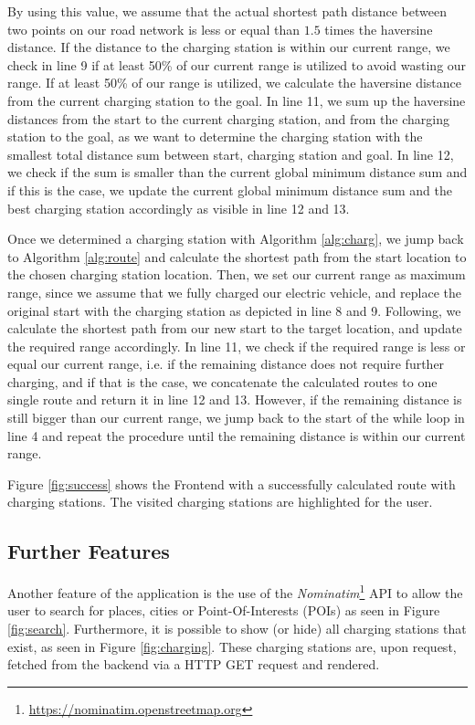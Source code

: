 \documentclass[a4paper]{article}
\begin{document}
By using this value, we assume that the actual shortest path distance between two points on our road network is less or equal than $1.5$ times the haversine distance.
If the distance to the charging station is within our current range, we check in line 9 if at least 50\% of our current range is utilized to avoid wasting our range.
If at least 50\% of our range is utilized, we calculate the haversine distance from the current charging station to the goal.
In line 11, we sum up the haversine distances from the start to the current charging station, and from the charging station to the goal, as we want to determine the charging station with the smallest total distance sum between start, charging station and goal.
In line 12, we check if the sum is smaller than the current global minimum distance sum and if this is the case, we update the current global minimum distance sum and the best charging station accordingly as visible in line 12 and 13.\par\medskip
Once we determined a charging station with Algorithm \ref{alg:charg}, we jump back to Algorithm \ref{alg:route} and calculate the shortest path from the start location to the chosen charging station location.
Then, we set our current range as maximum range, since we assume that we fully charged our electric vehicle, and replace the original start with the charging station as depicted in line 8 and 9.
Following, we calculate the shortest path from our new start to the target location, and update the required range accordingly.
In line 11, we check if the required range is less or equal our current range, i.e. if the remaining distance does not require further charging, and if that is the case, we concatenate the calculated routes to one single route and return it in line 12 and 13.
However, if the remaining distance is still bigger than our current range, we jump back to the start of the while loop in line 4 and repeat the procedure until the remaining distance is within our current range.\par\bigskip
Figure \ref{fig:success} shows the Frontend with a successfully calculated route with charging stations.
The visited charging stations are highlighted for the user. \\
\subsection{Further Features}
Another feature of the application is the use of the \textit{Nominatim}\footnote{\url{https://nominatim.openstreetmap.org}} API to allow the user to search for places, cities or Point-Of-Interests (POIs) as seen in Figure \ref{fig:search}.
Furthermore, it is possible to show (or hide) all charging stations that exist, as seen in Figure \ref{fig:charging}.
These charging stations are, upon request, fetched from the backend via a HTTP GET request and rendered.
\end{document}
